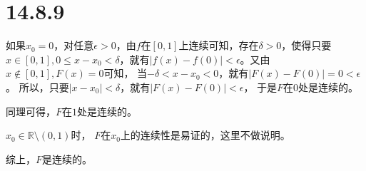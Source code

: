 \documentclass{article}
\begin{document}
\section*{14.8.9}

如果$x_0 = 0$，对任意$\epsilon > 0$，由$f$在$[0, 1]$上连续可知，存在$\delta > 0$，使得只要
$x \in [0, 1], 0 \leq x - x_0 < \delta$，就有$|f(x) - f(0)| < \epsilon$。又由$x \notin [0, 1], F(x) = 0$可知，
当$ -\delta < x - x_0 < 0$，就有$|F(x) - F(0)| = 0 < \epsilon$。
所以，只要$|x - x_0| < \delta$，就有$|F(x) - F(0)| < \epsilon$，
于是$F$在$0$处是连续的。

同理可得，$F$在$1$处是连续的。

$x_0 \in \mathbb{R} \setminus (0, 1)$时， $F$在$x_0$上的连续性是易证的，这里不做说明。

综上，$F$是连续的。
\end{document}
